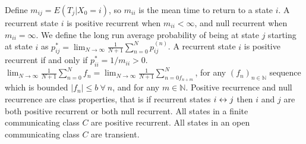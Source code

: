  Define $m_{ij} = E(T_j|X_0 = i)$, so $m_{ii}$ is the mean time to return to a state $i$. A recurrent state $i$ is positive recurrent when $m_{ii} < \infty$, and null recurrent when $m_{ii} = \infty$.
 We define the long run average probability of being at state $j$ starting at state $i$ as $p^*_{ij} = \lim_{N \to \infty} \frac{1}{N+1}\sum^N_{n=0} p^{(n)}_{ij}$.
 A recurrent state $i$ is positive recurrent if and only if $p^{*}_{ii} = 1/m_{ii} > 0$.
 $\lim_{N \to \infty} \frac{1}{N+1}\sum^N_{n=0} f_n =  \lim_{N \to \infty} \frac{1}{N+1}\sum^N_{n=0 f_{n+m}}$, for any $(f_n)_{n \in \mathbb{N}}$ sequence which is bounded $|f_n| \le b\ \forall\ n$, and for any $m \in \mathbb{N}$.
 Positive recurrence and null recurrence are class properties, that is if recurrent states $i \leftrightarrow j$ then $i$ and $j$ are both positive recurrent or both null recurrent.
 All states in a finite communicating class $C$ are positive recurrent.
 All states in an open communicating class $C$ are transient.